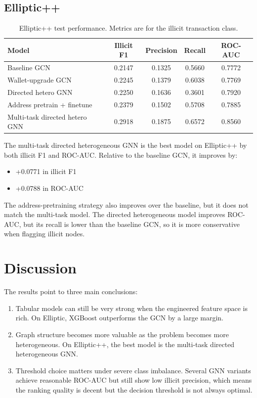 \documentclass[11pt,a4paper]{article}
\begin{document}
\subsection{Elliptic++}
\begin{table}[htbp]
\centering
\begin{tabular}{lcccc}
\toprule
Model & Illicit F1 & Precision & Recall & ROC-AUC \\
\midrule
Baseline GCN & 0.2147 & 0.1325 & 0.5660 & 0.7772 \\
Wallet-upgrade GCN & 0.2245 & 0.1379 & 0.6038 & 0.7769 \\
Directed hetero GNN & 0.2250 & 0.1636 & 0.3601 & 0.7920 \\
Address pretrain + finetune & 0.2379 & 0.1502 & 0.5708 & 0.7885 \\
Multi-task directed hetero GNN & 0.2918 & 0.1875 & 0.6572 & 0.8560 \\
\bottomrule
\end{tabular}
\caption{Elliptic++ test performance. Metrics are for the illicit transaction class.}
\label{tab:ellipticpp_results}
\end{table}

The multi-task directed heterogeneous GNN is the best model on Elliptic++ by both illicit F1 and ROC-AUC. Relative to the baseline GCN, it improves by:
\begin{itemize}[noitemsep]
    \item +0.0771 in illicit F1
    \item +0.0788 in ROC-AUC
\end{itemize}

The address-pretraining strategy also improves over the baseline, but it does not match the multi-task model. The directed heterogeneous model improves ROC-AUC, but its recall is lower than the baseline GCN, so it is more conservative when flagging illicit nodes.

\section{Discussion}
The results point to three main conclusions:
\begin{enumerate}[noitemsep]
    \item Tabular models can still be very strong when the engineered feature space is rich. On Elliptic, XGBoost outperforms the GCN by a large margin.
    \item Graph structure becomes more valuable as the problem becomes more heterogeneous. On Elliptic++, the best model is the multi-task directed heterogeneous GNN.
    \item Threshold choice matters under severe class imbalance. Several GNN variants achieve reasonable ROC-AUC but still show low illicit precision, which means the ranking quality is decent but the decision threshold is not always optimal.
\end{enumerate}
\end{document}
